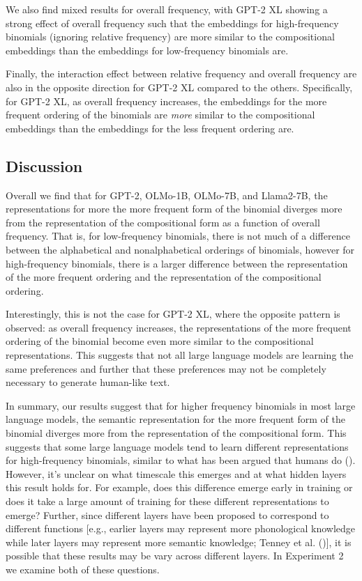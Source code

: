 \documentclass[
  12pt,
  letterpaper,
]{scrreprt}
\begin{document}
We also find mixed results for overall frequency, with GPT-2 XL showing
a strong effect of overall frequency such that the embeddings for
high-frequency binomials (ignoring relative frequency) are more similar
to the compositional embeddings than the embeddings for low-frequency
binomials are.

Finally, the interaction effect between relative frequency and overall
frequency are also in the opposite direction for GPT-2 XL compared to
the others. Specifically, for GPT-2 XL, as overall frequency increases,
the embeddings for the more frequent ordering of the binomials are
\emph{more} similar to the compositional embeddings than the embeddings
for the less frequent ordering are.

\subsection{Discussion}\label{discussion-8}

Overall we find that for GPT-2, OLMo-1B, OLMo-7B, and Llama2-7B, the
representations for more the more frequent form of the binomial diverges
more from the representation of the compositional form as a function of
overall frequency. That is, for low-frequency binomials, there is not
much of a difference between the alphabetical and nonalphabetical
orderings of binomials, however for high-frequency binomials, there is a
larger difference between the representation of the more frequent
ordering and the representation of the compositional ordering.

Interestingly, this is not the case for GPT-2 XL, where the opposite
pattern is observed: as overall frequency increases, the representations
of the more frequent ordering of the binomial become even more similar
to the compositional representations. This suggests that not all large
language models are learning the same preferences and further that these
preferences may not be completely necessary to generate human-like text.

In summary, our results suggest that for higher frequency binomials in
most large language models, the semantic representation for the more
frequent form of the binomial diverges more from the representation of
the compositional form. This suggests that some large language models
tend to learn different representations for high-frequency binomials,
similar to what has been argued that humans do
(). However, it's unclear on what timescale this emerges and at
what hidden layers this result holds for. For example, does this
difference emerge early in training or does it take a large amount of
training for these different representations to emerge? Further, since
different layers have been proposed to correspond to different functions
{[}e.g., earlier layers may represent more phonological knowledge while
later layers may represent more semantic knowledge; Tenney et al.
(){]}, it is
possible that these results may be vary across different layers. In
Experiment 2 we examine both of these questions.
\end{document}
